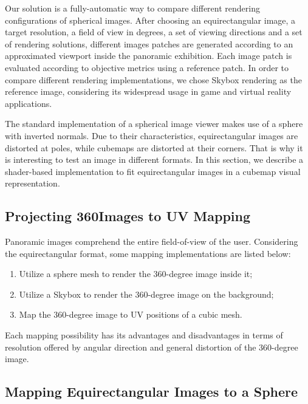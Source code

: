 \documentclass[10pt,conference]{IEEEtran}
\begin{document}
Our solution is a fully-automatic way to compare different rendering configurations of spherical images. After choosing an equirectangular image, a target resolution, a field of view in degrees, a set of viewing directions and a set of rendering solutions, different images patches are generated according to an approximated viewport inside the panoramic exhibition. Each image patch is evaluated according to objective metrics using a reference patch. In order to compare different rendering implementations, we chose Skybox rendering as the reference image, considering its widespread usage in game and virtual reality applications.

The standard implementation of a spherical image viewer makes use of a sphere with inverted normals. Due to their characteristics, equirectangular images are distorted at poles, while cubemaps are distorted at their corners. That is why it is interesting to test an image in different formats. In this section, we describe a shader-based implementation to fit equirectangular images in a cubemap visual representation.


\subsection{Projecting 360\degree Images to UV Mapping} \label{sec:uvmapping}

Panoramic images comprehend the entire field-of-view of the user. Considering the
equirectangular format, some mapping implementations are listed below:

\begin{enumerate}
    \item Utilize a sphere mesh to render the 360-degree image inside it;
    \item Utilize a Skybox to render the 360-degree image on the background;
    \item Map the 360-degree image to UV positions of a cubic mesh.
\end{enumerate}

Each mapping possibility has its advantages and disadvantages in terms of resolution offered by angular direction and general distortion of the 360-degree image.

\subsection{Mapping Equirectangular Images to a Sphere}
\end{document}
